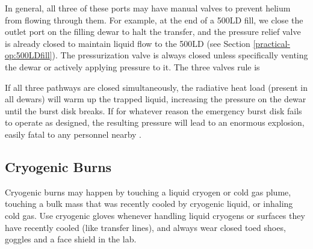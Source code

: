 In general, all three of these ports may have manual valves to prevent helium from flowing through them.  For example, at the end of a 500LD fill, we close the outlet port on the filling dewar to halt the transfer, and the pressure relief valve is already closed to maintain liquid flow to the 500LD (see Section \ref{practical-op:500LDfill}).  The pressurization valve is always closed unless specifically venting the dewar or actively applying pressure to it.  The three valves rule is


If all three pathways are closed simultaneously, the radiative heat load (present in all dewars) will warm up the trapped liquid, increasing the pressure on the dewar until the burst disk breaks.  If for whatever reason the emergency burst disk fails to operate as designed, the resulting pressure will lead to an enormous explosion, easily fatal to any personnel nearby \cite{lnexplosion}. 

\subsection{Cryogenic Burns}
Cryogenic burns may happen by touching a liquid cryogen or cold gas plume, touching a bulk mass that was recently cooled by cryogenic liquid, or inhaling cold gas.  Use cryogenic gloves whenever handling liquid cryogens or surfaces they have recently cooled (like transfer lines), and always wear closed toed shoes, goggles and a face shield in the lab.


\vspace{1cm}
\vspace{1cm}

